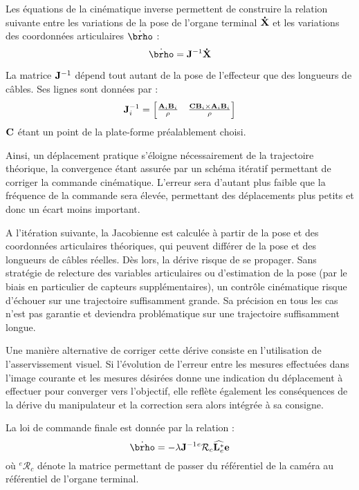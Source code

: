 Les équations de la cinématique inverse permettent de construire la relation suivante entre les variations de la pose de l'organe terminal ${\bf \dot X}$ et les variations des coordonnées articulaires ${\dot \brho}$ :
\begin{equation}
  \dot {\brho} = {\bf J}^{-1} {\bf \dot X} 
 \label{chap02:eq0}
\end{equation}

La matrice ${\bf J}^{-1}$ dépend tout autant de la pose de l'effecteur que des longueurs de câbles. Ses lignes sont données par :
\begin{equation}
  {\bf J}^{-1}_i = \begin{bmatrix}
                   \frac {{\bf A}_i {\bf B}_i} \rho & \frac {{\bf C}{\bf B}_i \times {\bf A}_i {\bf B}_i} \rho
                   \end{bmatrix}
 \label{chap02:eq1}
\end{equation}
${\bf C}$ étant un point de la plate-forme préalablement choisi.

Ainsi, un déplacement pratique s'éloigne nécessairement de la trajectoire 
théorique, la convergence étant assurée par un schéma itératif permettant de 
corriger la commande cinématique. L'erreur sera d'autant plus faible que la 
fréquence de la commande sera élevée, permettant des déplacements plus petits et 
donc un écart moins important.

A l'itération suivante, la Jacobienne est calculée à partir de la pose et des 
coordonnées articulaires théoriques, qui peuvent différer de la pose et des 
longueurs de câbles réelles. Dès lors, la dérive risque de se propager. Sans 
stratégie de relecture des variables articulaires ou d'estimation de la pose 
(par le biais en particulier de capteurs supplémentaires), un contrôle 
cinématique risque d'échouer sur une trajectoire suffisamment grande. Sa 
précision en tous les cas n'est pas garantie et deviendra problématique sur une 
trajectoire suffisamment longue.

Une manière alternative de corriger cette dérive consiste en l'utilisation de 
l'asservissement visuel. Si l'évolution de l'erreur entre les mesures effectuées 
dans l'image courante et les mesures désirées donne une indication du 
déplacement à effectuer pour converger vers l'objectif, elle reflète également 
les conséquences de la dérive du manipulateur et la correction sera alors 
intégrée à sa consigne.

La loi de commande finale est donn\'ee par la relation :
\begin{equation}
 \dot \brho = -\lambda {\bf J}^{-1}  {}^e \mathcal R_c \widehat {{\bf L}^*_e} 
{\bf e}
\label{chap02:eq2}
\end{equation}
o\`u ${}^e \mathcal R_c$ d\'enote la matrice permettant de passer du 
r\'ef\'erentiel de la cam\'era au r\'ef\'erentiel de l'organe terminal.





